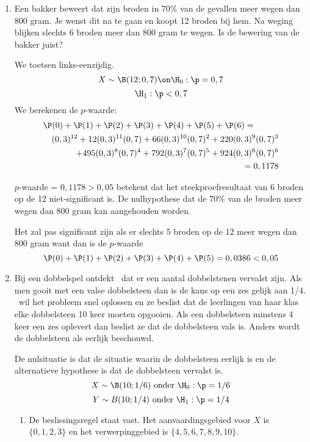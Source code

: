 {\begin{enumerate}
Het is pas significant vanaf 6 genezingen want dan is\\
$p$-waarde = $\P(6)+\P(7)+\P(8)+\P(9)+\P(10)=0,047<0,05 $

\item Een bakker beweert dat zijn broden in $70\%$ van de gevallen meer 
wegen dan 800 gram. Je wenst dit na te gaan en koopt 12 broden bij hem. 
Na weging blijken slechts 6 broden meer dan 800 gram te wegen. Is de bewering 
van de bakker juist?

We toetsen links-eenzijdig.
 $$X\sim\B(12;0,7)\on\H_0:\p=0,7$$
 $$\H_1:\p<0,7$$
We berekenen de $p$-waarde:
\begin{eqnarray*}
\lefteqn{\P(0)+\P(1)+\P(2)+\P(3)+\P(4)+\P(5)+\P(6)=} \\
 & & (0,3)^{12}+12(0,3)^{11}(0,7)+66(0,3)^{10}(0,7)^2+220(0,3)^9(0,7)^3\\
 & & +495(0,3)^8(0,7)^4+792(0,3)^7(0,7)^5+924(0,3)^6(0,7)^6\\
 & & =0,1178
 \end{eqnarray*}
 
 $p$-waarde = $0,1178>0,05$ betekent dat het steekproefresultaat van 6 broden op de 12
 niet-significant is. De nulhypothese dat de $70\%$ van de broden meer wegen dan 
800 gram kan aangehouden worden.

Het zal pas significant zijn als er slechts 5 broden op de 12 meer wegen dan 
800 gram want dan is de $p$-waarde 
$$\P(0)+\P(1)+\P(2)+\P(3)+\P(4)+\P(5)=0,0386<0,05$$



\item \label{casino} Bij een dobbelspel ontdekt \leerlu\  dat er een aantal  dobbelstenen vervalst zijn. Als men gooit met een valse dobbelsteen dan is de kans op een zes gelijk aan 1/4. \leerlu\ wil het probleem snel oplossen en ze beslist dat de  leerlingen van haar klas elke dobbelsteen 10 keer moeten opgooien. Als een dobbelsteen minstens 4 keer een zes oplevert dan beslist ze dat de dobbelsteen vals is. Anders wordt de dobbelsteen als eerlijk beschouwd.

De nulsituatie is dat de situatie waarin de dobbelsteen eerlijk is en de alternatieve hypothese is dat de dobbelsteen vervalst is.
$$X\sim \B(10;1/6)\mbox{ onder } \H_0:\p=1/6$$
$$Y\sim\\B(10;1/4)\mbox{ onder }\H_1:\p=1/4$$ 

\begin{enumerate}
\item De beslissingsregel staat vast.
Het aanvaardingsgebied voor $X$ is $\{0,1,2,3\}$ en het verwerpinggebied is $\{4,5,6,7,8,9,10\}$. 


\end{enumerate}
\end{enumerate}}
